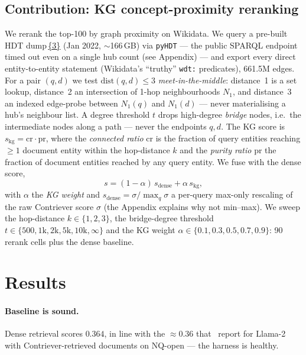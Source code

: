 \documentclass{article}
\begin{document}
\subsection{Contribution: KG concept-proximity reranking}
We rerank the top-100 by graph proximity on Wikidata. We query a pre-built HDT dump\,\href{https://hdt-dumps.cluster.ai.wu.ac.at/dumps/}{\{3\}} (Jan 2022, $\sim$166\,GB) via \texttt{pyHDT} --- the public SPARQL endpoint timed out even on a single hub count (see Appendix) --- and export every direct entity-to-entity statement (Wikidata's ``truthy'' \texttt{wdt:} predicates), 661.5M edges. For a pair $(q,d)$ we test $\mathrm{dist}(q,d)\le 3$ \emph{meet-in-the-middle}: distance~1 is a set lookup, distance~2 an intersection of 1-hop neighbourhoods $N_1$, and distance~3 an indexed edge-probe between $N_1(q)$ and $N_1(d)$ --- never materialising a hub's neighbour list. A degree threshold $t$ drops high-degree \emph{bridge} nodes, i.e.\ the intermediate nodes along a path --- never the endpoints $q,d$. The KG score is $s_{\mathrm{kg}}=\mathrm{cr}\cdot\mathrm{pr}$, where the \emph{connected ratio} $\mathrm{cr}$ is the fraction of query entities reaching $\ge1$ document entity within the hop-distance $k$ and the \emph{purity ratio} $\mathrm{pr}$ the fraction of document entities reached by any query entity. We fuse with the dense score,
\begin{equation}\label{eq:fuse}
s = (1-\alpha)\,s_{\mathrm{dense}} + \alpha\,s_{\mathrm{kg}},
\end{equation}
with $\alpha$ the \emph{KG weight} and $s_{\mathrm{dense}}=\sigma/\max_q\sigma$ a per-query max-only rescaling of the raw Contriever score $\sigma$ (the Appendix explains why not min--max). We sweep the hop-distance $k\in\{1,2,3\}$, the bridge-degree threshold $t\in\{500,1\text{k},2\text{k},5\text{k},10\text{k},\infty\}$ and the KG weight $\alpha\in\{0.1,0.3,0.5,0.7,0.9\}$: 90 rerank cells plus the dense baseline.

\section{Results}

\paragraph*{Baseline is sound.} Dense retrieval scores $0.364$, in line with the $\approx$0.36 that~\citet{Cuconasu_2024} report for Llama-2 with Contriever-retrieved documents on NQ-open --- the harness is healthy.
\end{document}
